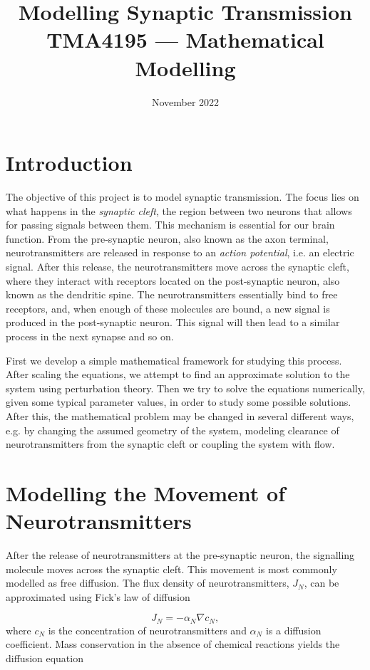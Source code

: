 \documentclass{article}
\title{Modelling Synaptic Transmission \\
\large TMA4195 — Mathematical Modelling \\
}
\date{November 2022}
\begin{document}
\maketitle

\section{Introduction}\label{Section:Intro}
The objective of this project is to model synaptic transmission. The focus lies on what happens in the \textit{synaptic cleft}, the region between two neurons that allows for passing signals between them. This mechanism is essential for our brain function. From the pre-synaptic neuron, also known as the axon terminal, neurotransmitters are released in response to an \textit{action potential}, i.e. an electric signal. After this release, the neurotransmitters move across the synaptic cleft, where they interact with receptors located on the post-synaptic neuron, also known as the dendritic spine. The neurotransmitters essentially bind to free receptors, and, when enough of these molecules are bound, a new signal is produced in the post-synaptic neuron. This signal will then lead to a similar process in the next synapse and so on. 

First we develop a simple mathematical framework for studying this process. After scaling the equations, we attempt to find an approximate solution to the system using perturbation theory. Then we try to solve the equations numerically, given some typical parameter values, in order to study some possible solutions. After this, the mathematical problem may be changed in several different ways, e.g. by changing the assumed geometry of the system, modeling clearance of neurotransmitters from the synaptic cleft or coupling the system with flow. 


\section{Modelling the Movement of Neurotransmitters}\label{Section:Diffusion}
After the release of neurotransmitters at the pre-synaptic neuron, the signalling molecule moves across the synaptic cleft. This movement is most commonly modelled as free diffusion. The flux density of neurotransmitters, $J_N$, can be approximated using Fick's law of diffusion

\begin{equation}
    J_N = -\alpha_N\nabla c_N,
    \label{Eq: Ficks Law}
\end{equation}
where $c_N$ is the concentration of neurotransmitters and $\alpha_N$ is a diffusion coefficient. Mass conservation in the absence of chemical reactions yields the diffusion equation 
\end{document}
